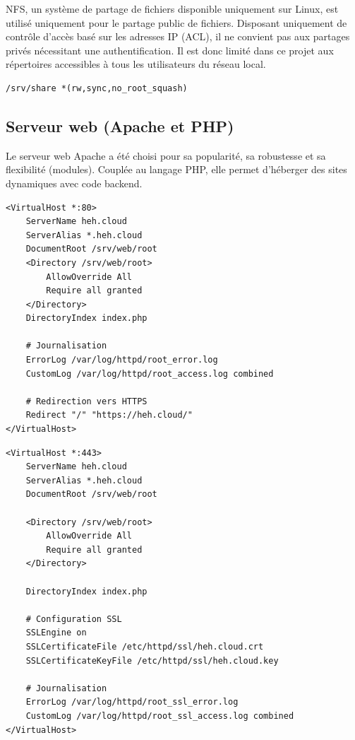 \documentclass[a4paper,12pt]{article}
\begin{document}
NFS, un système de partage de fichiers disponible uniquement sur Linux, est utilisé uniquement pour le partage public de fichiers. Disposant uniquement de contrôle d'accès basé sur les adresses IP (ACL), il ne convient pas aux partages privés nécessitant une authentification. Il est donc limité dans ce projet aux répertoires accessibles à tous les utilisateurs du réseau local.

\begin{lstlisting}[caption={Configuration NFS – /etc/exports}]
/srv/share *(rw,sync,no_root_squash)
\end{lstlisting}

\clearpage
\subsection{Serveur web (Apache et PHP)}

Le serveur web Apache a été choisi pour sa popularité, sa robustesse et sa flexibilité (modules). Couplée au langage PHP, elle permet d'héberger des sites dynamiques avec code backend.

\begin{lstlisting}[caption={Configuration Apache – /etc/httpd/conf.d/heh.cloud.conf}]
<VirtualHost *:80>
    ServerName heh.cloud
    ServerAlias *.heh.cloud
    DocumentRoot /srv/web/root
    <Directory /srv/web/root>
        AllowOverride All
        Require all granted
    </Directory>
    DirectoryIndex index.php
    
    # Journalisation
    ErrorLog /var/log/httpd/root_error.log
    CustomLog /var/log/httpd/root_access.log combined

    # Redirection vers HTTPS
    Redirect "/" "https://heh.cloud/"
</VirtualHost>
\end{lstlisting}

\begin{lstlisting}[caption={Configuration Apache SSL – /etc/httpd/conf.d/heh.cloud-ssl.conf}]
<VirtualHost *:443>
    ServerName heh.cloud
    ServerAlias *.heh.cloud
    DocumentRoot /srv/web/root
    
    <Directory /srv/web/root>
        AllowOverride All
        Require all granted
    </Directory>
    
    DirectoryIndex index.php
    
    # Configuration SSL
    SSLEngine on
    SSLCertificateFile /etc/httpd/ssl/heh.cloud.crt
    SSLCertificateKeyFile /etc/httpd/ssl/heh.cloud.key
    
    # Journalisation
    ErrorLog /var/log/httpd/root_ssl_error.log
    CustomLog /var/log/httpd/root_ssl_access.log combined
</VirtualHost>
\end{lstlisting}
\end{document}
